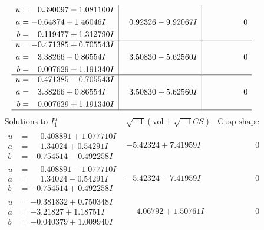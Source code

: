 \documentclass[1p]{elsarticle_modified}
\theoremstyle{definition}
\newcommand{\I}{\sqrt{-1}}
\begin{document}
$$\begin{array}{c|c|c}
\begin{aligned}
u &= \phantom{-}0.390097 - 1.081100 I \\
a &= -0.64874 + 1.46046 I \\
b &= \phantom{-}0.119477 + 1.312790 I\end{aligned}
 & \phantom{-}0.92326 - 9.92067 I & \phantom{-0.000000 } 0 \\ \hline\begin{aligned}
u &= -0.471385 + 0.705543 I \\
a &= \phantom{-}3.38266 - 0.86554 I \\
b &= \phantom{-}0.007629 - 1.191340 I\end{aligned}
 & \phantom{-}3.50830 - 5.62560 I & \phantom{-0.000000 } 0 \\ \hline\begin{aligned}
u &= -0.471385 - 0.705543 I \\
a &= \phantom{-}3.38266 + 0.86554 I \\
b &= \phantom{-}0.007629 + 1.191340 I\end{aligned}
 & \phantom{-}3.50830 + 5.62560 I & \phantom{-0.000000 } 0\\
 \hline 
 \end{array}$$\newpage$$\begin{array}{c|c|c}  
\text{Solutions to }I^u_{1}& \I (\text{vol} + \sqrt{-1}CS) & \text{Cusp shape}\\
 \hline 
\begin{aligned}
u &= \phantom{-}0.408891 + 1.077710 I \\
a &= \phantom{-}1.34024 + 0.54291 I \\
b &= -0.754514 - 0.492258 I\end{aligned}
 & -5.42324 + 7.41959 I & \phantom{-0.000000 } 0 \\ \hline\begin{aligned}
u &= \phantom{-}0.408891 - 1.077710 I \\
a &= \phantom{-}1.34024 - 0.54291 I \\
b &= -0.754514 + 0.492258 I\end{aligned}
 & -5.42324 - 7.41959 I & \phantom{-0.000000 } 0 \\ \hline\begin{aligned}
u &= -0.381832 + 0.750348 I \\
a &= -3.21827 + 1.18751 I \\
b &= -0.040379 + 1.009940 I\end{aligned}
 & \phantom{-}4.06792 + 1.50761 I & \phantom{-0.000000 } 0 \\ \hline\begin{aligned}

\end{aligned}
\end{array}$$
\end{document}
